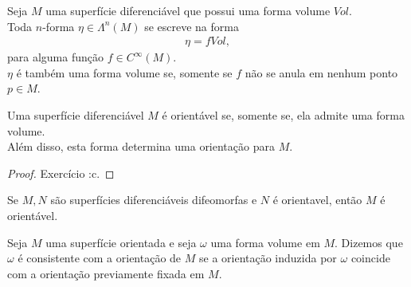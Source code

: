 \begin{proposition}
  Seja $M$ uma superfície diferenciável que possui uma forma volume $Vol$.\\
  Toda $n$-forma $\eta\in\Lambda^{n}(M)$ se escreve na forma
  \begin{align*}
    \eta=f Vol,
  \end{align*}
  para alguma função $f\in C^{\infty}(M)$.\\
  $\eta$ é também uma forma volume se, somente se $f$ não se anula em nenhum ponto $p\in M$. 
\end{proposition}
\begin{theorem}
  Uma superfície diferenciável $M$ é orientável se, somente se, ela admite uma forma volume.\\
  Além disso, esta forma determina uma orientação para $M$.
\end{theorem}
\begin{proof} 
  Exercício :c.  
\end{proof}
\begin{corollary}
  Se $M,N$ são superfícies diferenciáveis difeomorfas e $N$ é orientavel, então $M$ é orientável. 
\end{corollary}
\begin{definition}
   Seja $M$ uma superfície orientada e seja $\omega$ uma forma volume em $M$. Dizemos que $\omega$ é consistente com a orientação de $M$ se a orientação induzida por $\omega$ coincide com a orientação previamente fixada em $M$.
\end{definition}
